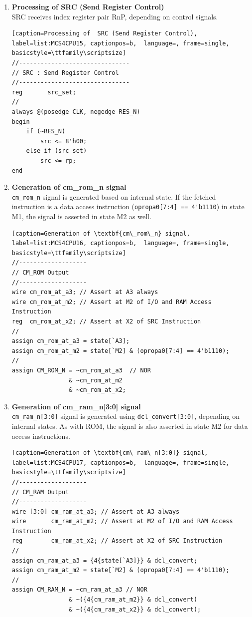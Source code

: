 \begin{enumerate}[(1)]
\item \textbf{Processing of  SRC (Send Register Control)}\\
SRC receives index register pair RnP, depending on control signals.
\\
\begin{lstlisting}[caption=Processing of  SRC (Send Register Control), 
label=list:MCS4CPU15, captionpos=b,  language=, frame=single, basicstyle=\ttfamily\scriptsize]
//-------------------------------
// SRC : Send Register Control
//-------------------------------
reg       src_set;
//
always @(posedge CLK, negedge RES_N)
begin
    if (~RES_N)
        src <= 8'h00;
    else if (src_set)
        src <= rp;
end
\end{lstlisting}

\item \textbf{Generation of \textbf{cm\_rom\_n} signal}\\
\verb|cm_rom_n| signal is generated based on internal state. If the fetched instruction is a data access instruction (\verb|opropa0[7:4] == 4'b1110|) in state M1, the signal is asserted in state M2 as well.
\\
\begin{lstlisting}[caption=Generation of \textbf{cm\_rom\_n} signal, 
label=list:MCS4CPU16, captionpos=b,  language=, frame=single, basicstyle=\ttfamily\scriptsize]
//-------------------
// CM_ROM Output
//-------------------
wire cm_rom_at_a3; // Assert at A3 always
wire cm_rom_at_m2; // Assert at M2 of I/O and RAM Access Instruction
reg  cm_rom_at_x2; // Assert at X2 of SRC Instruction
//
assign cm_rom_at_a3 = state[`A3];
assign cm_rom_at_m2 = state[`M2] & (opropa0[7:4] == 4'b1110);
//
assign CM_ROM_N = ~cm_rom_at_a3  // NOR
                & ~cm_rom_at_m2
                & ~cm_rom_at_x2;
\end{lstlisting}

\item \textbf{Generation of \textbf{cm\_ram\_n[3:0]} signal}\\
\verb|cm_ram_n[3:0]| signal is generated using \verb|dcl_convert[3:0]|, depending on internal states. As with ROM, the signal is also asserted in state M2 for data access instructions.
\\
\begin{lstlisting}[caption=Generation of \textbf{cm\_ram\_n[3:0]} signal, 
label=list:MCS4CPU17, captionpos=b,  language=, frame=single, basicstyle=\ttfamily\scriptsize]
//-------------------
// CM_RAM Output
//-------------------
wire [3:0] cm_ram_at_a3; // Assert at A3 always
wire       cm_ram_at_m2; // Assert at M2 of I/O and RAM Access Instruction
reg        cm_ram_at_x2; // Assert at X2 of SRC Instruction
//
assign cm_ram_at_a3 = {4{state[`A3]}} & dcl_convert;
assign cm_ram_at_m2 = state[`M2] & (opropa0[7:4] == 4'b1110);
//
assign CM_RAM_N = ~cm_ram_at_a3 // NOR
                & ~({4{cm_ram_at_m2}} & dcl_convert)
                & ~({4{cm_ram_at_x2}} & dcl_convert);
\end{lstlisting}


\end{enumerate}
